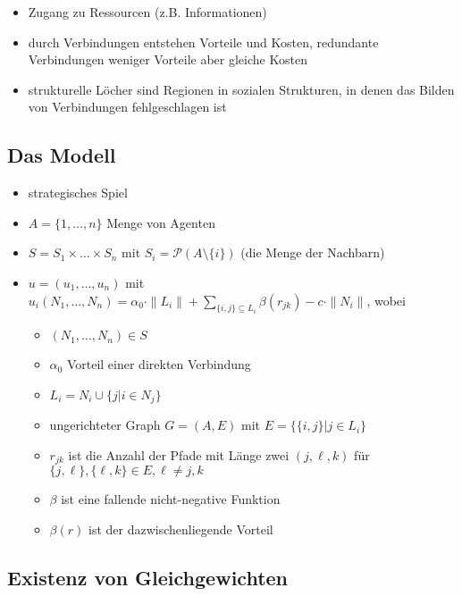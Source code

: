 \begin{itemize}
	\item Zugang zu Ressourcen (z.B. Informationen)
	\item durch Verbindungen entstehen Vorteile und Kosten, redundante Verbindungen weniger Vorteile aber gleiche Kosten
	\item strukturelle Löcher sind Regionen in sozialen Strukturen, in denen das Bilden von Verbindungen fehlgeschlagen ist
\end{itemize}
\subsection{Das Modell}
	\begin{itemize}
		\item strategisches Spiel
		\item $A=\{1,\dots,n\}$ Menge von Agenten
		\item $S=S_1\times\dots\times S_n$ mit $S_i=\mathcal{P}(A\setminus\{i\})$ (die Menge der Nachbarn)
		\item $u=(u_1,\dots,u_n)$ mit $u_i(N_1,\dots,N_n)=\alpha_0\cdot\|L_i\|+\sum\limits_{\{i,j\}\subseteq L_i}\beta(r_{jk})-c\cdot \|N_i\|$, wobei
			\begin{itemize}
				\item $(N_1,\dots,N_n)\in S$
				\item $\alpha_0$ Vorteil einer direkten Verbindung
				\item $L_i=N_i\cup\{j|i\in N_j\}$
				\item ungerichteter Graph $G=(A,E)$ mit $E=\{\{i,j\}|j\in L_i\}$
				\item $r_{jk}$ ist die Anzahl der Pfade mit Länge zwei $(j,\ell,k)$ für $\{j,\ell\},\{\ell,k\}\in E,\ell\neq j,k$
				\item $\beta$ ist eine fallende nicht-negative Funktion
				\item $\beta(r)$ ist der dazwischenliegende Vorteil
			\end{itemize}
	\end{itemize}
\subsection{Existenz von Gleichgewichten}